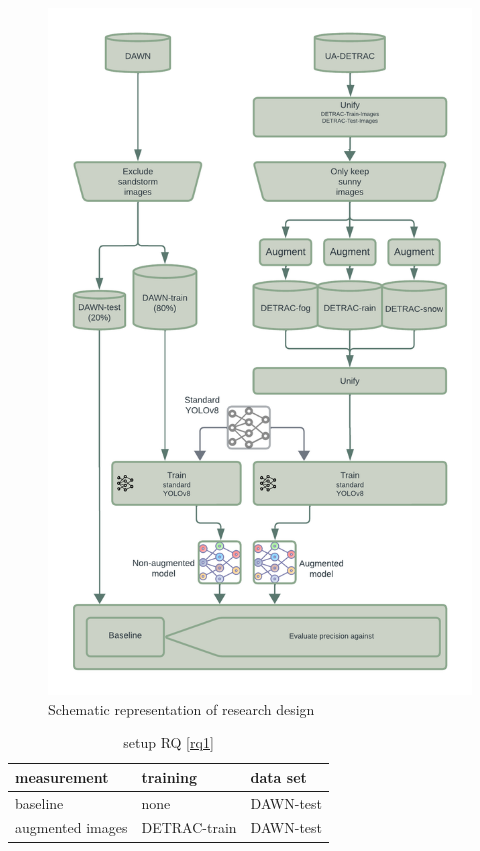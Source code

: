 \documentclass[]{article}
\begin{document}
	\begin{figure}[H]
		\centering
		\includegraphics[scale=0.21]{Proposal_diagram.png}
		\caption{Schematic representation of research design}
		\label{fig:experiment_process}
	\end{figure}
	

	\begin{table}[H]
		\centering
		\begin{tabular}{lll}
			\toprule
			\textbf{measurement} & \textbf{training} & \textbf{data set} \\
			\midrule
			baseline & none & DAWN-test \\
			augmented images & DETRAC-train & DAWN-test \\
			\bottomrule
		\end{tabular}
		\caption{setup RQ \ref{rq1}}
		\label{table:setuprq1}
	\end{table}
\end{document}
